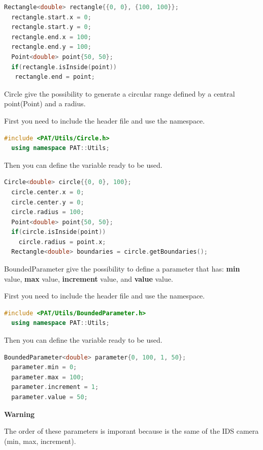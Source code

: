 \begin{lstlisting}[language=c++, gobble=2]
  Rectangle<double> rectangle{{0, 0}, {100, 100}};
  rectangle.start.x = 0;
  rectangle.start.y = 0;
  rectangle.end.x = 100;
  rectangle.end.y = 100;
  Point<double> point{50, 50};
  if(rectangle.isInside(point))
   rectangle.end = point;
\end{lstlisting}


Circle give the possibility to generate a circular range defined by a
central point(Point) and a radius.

First you need to include the header file and use the namespace.

\begin{lstlisting}[language=c++, gobble=2]
  #include <PAT/Utils/Circle.h>
  using namespace PAT::Utils;
\end{lstlisting}

Then you can define the variable ready to be used.

\begin{lstlisting}[language=c++, gobble=2]
  Circle<double> circle{{0, 0}, 100};
  circle.center.x = 0;
  circle.center.y = 0;
  circle.radius = 100;
  Point<double> point{50, 50};
  if(circle.isInside(point))
    circle.radius = point.x;
  Rectangle<double> boundaries = circle.getBoundaries();
\end{lstlisting}


BoundedParameter give the possibility to define a parameter that has:
\textbf{min} value, \textbf{max} value, \textbf{increment} value, and
\textbf{value} value.

First you need to include the header file and use the namespace.

\begin{lstlisting}[language=c++, gobble=2]
  #include <PAT/Utils/BoundedParameter.h>
  using namespace PAT::Utils;
\end{lstlisting}

Then you can define the variable ready to be used.

\begin{lstlisting}[language=c++, gobble=2]
  BoundedParameter<double> parameter{0, 100, 1, 50};
  parameter.min = 0;
  parameter.max = 100;
  parameter.increment = 1;
  parameter.value = 50;
\end{lstlisting}

\textbf{Warning}

The order of these parameters is imporant because is the same of the IDS
camera (min, max, increment).


